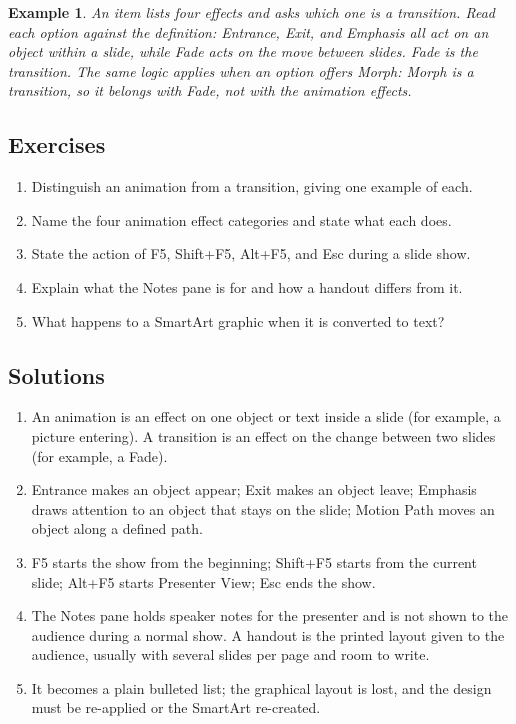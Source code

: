 \documentclass[11pt]{article}
\newtheorem{example}{Example}[section]
\begin{document}
\begin{example}
An item lists four effects and asks which one is a transition. Read each
option against the definition: Entrance, Exit, and Emphasis all act on an
object within a slide, while Fade acts on the move between slides. Fade is the
transition. The same logic applies when an option offers Morph: Morph is a
transition, so it belongs with Fade, not with the animation effects.
\end{example}

\subsection*{Exercises}
\begin{enumerate}[label=\arabic*.]
  \item Distinguish an animation from a transition, giving one example of each.
  \item Name the four animation effect categories and state what each does.
  \item State the action of F5, Shift+F5, Alt+F5, and Esc during a slide show.
  \item Explain what the Notes pane is for and how a handout differs from it.
  \item What happens to a SmartArt graphic when it is converted to text?
\end{enumerate}

\subsection*{Solutions}
\begingroup\small
\begin{enumerate}[label=\arabic*.]
  \item An animation is an effect on one object or text inside a slide (for
    example, a picture entering). A transition is an effect on the change
    between two slides (for example, a Fade).
  \item Entrance makes an object appear; Exit makes an object leave; Emphasis
    draws attention to an object that stays on the slide; Motion Path moves an
    object along a defined path.
  \item F5 starts the show from the beginning; Shift+F5 starts from the current
    slide; Alt+F5 starts Presenter View; Esc ends the show.
  \item The Notes pane holds speaker notes for the presenter and is not shown
    to the audience during a normal show. A handout is the printed layout given
    to the audience, usually with several slides per page and room to write.
  \item It becomes a plain bulleted list; the graphical layout is lost, and the
    design must be re-applied or the SmartArt re-created.
\end{enumerate}
\endgroup
\end{document}
